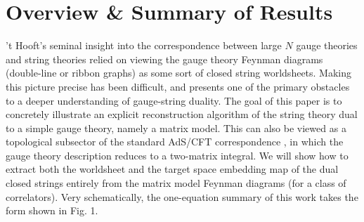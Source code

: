 \documentclass[english]{article}
\renewcommand{\>}{\rangle}
\newcommand{\<}{\langle}
\renewcommand{\(}{\left(}
\renewcommand{\)}{\right)}
\begin{document}
\begin{abstract}
\noindent For correlators in $\mathcal{N}=4$ Super Yang-Mills preserving half the supersymmetry, we manifestly recast the gauge theory Feynman diagram expansion as a sum over dual closed strings. Each individual Feynman diagram maps on to a Riemann surface with specific moduli. The Feynman diagrams thus correspond to discrete lattice points on string moduli space, rather than discretized worldsheets. This picture is valid to all orders in the $1/N$ expansion. Concretely, the mapping is carried out at the level of a two-matrix integral with its dual string description. It provides a microscopic picture of open/closed string duality for this topological subsector of the full AdS/CFT correspondence. At the same time, the concrete mechanism for how strings emerge from the matrix model Feynman diagrams predicts that multiple open string descriptions can exist for the same dual closed string theory. By considering the insertion of determinant operators in $\mathcal{N}=4$ SYM, we indeed find six equivalent open-string descriptions. Each of them generates Feynman diagrams related to one another via (partial) graph duality, and hence encodes the same information. The embedding of these Kontsevich-like duals into the 1/2 SUSY sector of AdS/CFT is achieved by open strings on giant graviton branes. 
 

\end{abstract}

\pagebreak

\tableofcontents

\pagebreak

\section{Overview \& Summary of Results}

't Hooft's seminal insight into the correspondence between large $N$ gauge theories and string theories \cite{tHooftPlanar} relied on viewing the gauge theory Feynman diagrams (double-line or ribbon graphs) as some sort of closed string worldsheets. Making this picture precise has been difficult, and presents one of the primary obstacles to a deeper understanding of gauge-string duality. The goal of this paper is to concretely illustrate an explicit reconstruction algorithm of the string theory dual to a simple gauge theory, namely a matrix model. This can also be viewed as a topological subsector of the standard AdS/CFT correspondence \cite{Maldacena:1997re,Adsandholog,Gubser:1998bc}, in which the gauge theory description reduces to a two-matrix integral. We will show how to extract both the worldsheet and the target space embedding map of the dual closed strings entirely from the matrix model Feynman diagrams (for a class of correlators). Very schematically, the one-equation summary of this work takes the form shown in Fig. 1.
\end{document}
